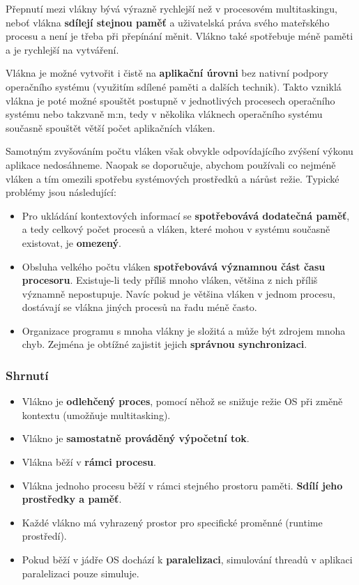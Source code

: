 Přepnutí mezi vlákny bývá výrazně rychlejší než v procesovém multitaskingu, neboť vlákna \textbf{sdílejí stejnou paměť }a uživatelská práva svého mateřského procesu a není je třeba při přepínání měnit. Vlákno také spotřebuje méně paměti a je rychlejší na vytváření.

Vlákna je možné vytvořit i čistě na \textbf{aplikační úrovni} bez nativní podpory operačního systému (využitím sdílené paměti a dalších technik). Takto vzniklá vlákna je poté možné spouštět postupně v jednotlivých procesech operačního systému nebo takzvaně m:n, tedy v několika vláknech operačního systému současně spouštět větší počet aplikačních vláken. 

Samotným zvyšováním počtu vláken však obvykle odpovídajícího zvýšení výkonu aplikace nedosáhneme. Naopak se doporučuje, abychom používali co nejméně vláken a tím omezili spotřebu systémových prostředků a nárůst režie. Typické problémy jsou následující:

\begin{itemize}
\item Pro ukládání kontextových informací se \textbf{spotřebovává dodatečná paměť}, a tedy celkový počet procesů a vláken, které mohou v systému současně existovat, je \textbf{omezený}.
\item Obsluha velkého počtu vláken \textbf{spotřebovává významnou část času procesoru}. Existuje-li tedy příliš mnoho vláken, většina z nich příliš významně nepostupuje. Navíc pokud je většina vláken v jednom procesu, dostávají se vlákna jiných procesů na řadu méně často.
\item Organizace programu s mnoha vlákny je složitá a může být zdrojem mnoha chyb. Zejména je obtížné zajistit jejich \textbf{správnou synchronizaci}.
\end{itemize}

\subsubsection{Shrnutí}
\begin{itemize}
	\item Vlákno je \textbf{odlehčený proces}, pomocí něhož se snižuje režie OS při změně kontextu (umožňuje multitasking).
	\item Vlákno je \textbf{samostatně prováděný výpočetní tok}.
	\item Vlákna běží v \textbf{rámci procesu}.
	\item Vlákna jednoho procesu běží v rámci stejného prostoru paměti. \textbf{Sdílí jeho prostředky a paměť}.
	\item Každé vlákno má vyhrazený prostor pro specifické proměnné (runtime prostředí).
	\item Pokud běží v jádře OS dochází k \textbf{paralelizaci}, simulování threadů v aplikaci paralelizaci pouze simuluje.
\end{itemize}

